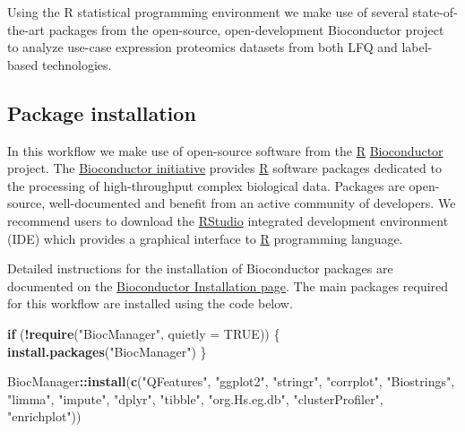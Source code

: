 \documentclass[9pt,a4paper,]{extarticle}
\newenvironment{Shaded}{\begin{snugshade}}{\end{snugshade}}
\newcommand{\AttributeTok}[1]{\textcolor[rgb]{0.13,0.29,0.53}{#1}}
\newcommand{\ConstantTok}[1]{\textcolor[rgb]{0.56,0.35,0.01}{#1}}
\newcommand{\ControlFlowTok}[1]{\textcolor[rgb]{0.13,0.29,0.53}{\textbf{#1}}}
\newcommand{\FunctionTok}[1]{\textcolor[rgb]{0.13,0.29,0.53}{\textbf{#1}}}
\newcommand{\NormalTok}[1]{#1}
\newcommand{\SpecialCharTok}[1]{\textcolor[rgb]{0.81,0.36,0.00}{\textbf{#1}}}
\newcommand{\StringTok}[1]{\textcolor[rgb]{0.31,0.60,0.02}{#1}}
\begin{document}
Using the R statistical programming environment \citep{Rstat} we make use of several
state-of-the-art packages from the open-source, open-development Bioconductor
project \citep{Huber2015} to analyze use-case expression proteomics datasets
\citep{HutchingsData} from both LFQ and label-based technologies.

\subsection{Package installation}\label{package-installation}

In this workflow we make use of open-source software from the
\href{https://www.r-project.org}{R} \href{https://bioconductor.org}{Bioconductor}
\citep{Huber2015} project. The \href{https://bioconductor.org}{Bioconductor initiative}
provides \href{https://www.r-project.org}{R} software packages dedicated
to the processing of high-throughput complex biological data. Packages are
open-source, well-documented and benefit from an active community of developers.
We recommend users to download the
\href{https://posit.co/download/rstudio-desktop/}{RStudio} integrated development
environment (IDE) which provides a graphical interface to
\href{https://www.r-project.org}{R} programming language.

Detailed instructions for the installation of Bioconductor packages are
documented on the \href{http://bioconductor.org/install/}{Bioconductor Installation page}.
The main packages required for this workflow are installed using the code below.

\begin{Shaded}
\begin{Highlighting}[]
\ControlFlowTok{if}\NormalTok{ (}\SpecialCharTok{!}\FunctionTok{require}\NormalTok{(}\StringTok{"BiocManager"}\NormalTok{, }\AttributeTok{quietly =} \ConstantTok{TRUE}\NormalTok{)) \{}
  \FunctionTok{install.packages}\NormalTok{(}\StringTok{"BiocManager"}\NormalTok{)}
\NormalTok{\}}

\NormalTok{BiocManager}\SpecialCharTok{::}\FunctionTok{install}\NormalTok{(}\FunctionTok{c}\NormalTok{(}\StringTok{"QFeatures"}\NormalTok{,}
                       \StringTok{"ggplot2"}\NormalTok{,}
                       \StringTok{"stringr"}\NormalTok{,}
                       \StringTok{"corrplot"}\NormalTok{,}
                       \StringTok{"Biostrings"}\NormalTok{,}
                       \StringTok{"limma"}\NormalTok{,}
                       \StringTok{"impute"}\NormalTok{,}
                       \StringTok{"dplyr"}\NormalTok{,}
                       \StringTok{"tibble"}\NormalTok{,}
                       \StringTok{"org.Hs.eg.db"}\NormalTok{,}
                       \StringTok{"clusterProfiler"}\NormalTok{,}
                       \StringTok{"enrichplot"}\NormalTok{))}
\end{Highlighting}
\end{Shaded}
\end{document}
